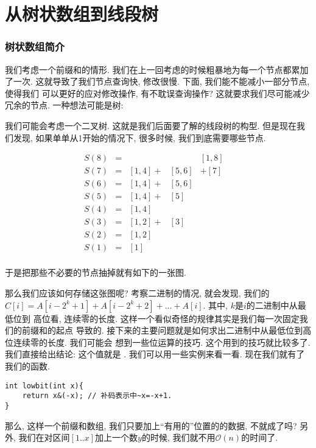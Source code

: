 \part{从树状数组到线段树}

\section{树状数组简介}

我们考虑一个前缀和的情形. 我们在上一回考虑的时候粗暴地为每一个节点都累加了一次. 
这就导致了我们节点查询快, 修改很慢. 下面, 我们能不能减小一部分节点, 使得我们
可以更好的应对修改操作, 有不耽误查询操作? 这就要求我们尽可能减少冗余的节点. 
一种想法可能是树: 


我们可能会考虑一个二叉树. 这就是我们后面要了解的线段树的构型. 但是现在我们发现, 
如果单单从1开始的情况下, 很多时候, 我们到底需要哪些节点. 

\begin{align*}
    S(8) &= &&&[1,8] &~\\
    S(7) &= &[1,4] + &[5,6] &+ [7] &~\\
    S(6) &= &[1,4] + &[5,6]&&~ \\
    S(5) &= &[1,4] + &[5]&&~ \\
    S(4) &= &[1,4]&&&~ \\
    S(3) &= &[1,2] + &[3]&&~ \\
    S(2) &= &[1,2]&&&~ \\
    S(1) &= &[1]&&&~ \\
\end{align*}

于是把那些不必要的节点抽掉就有如下的一张图. 


那么我们应该如何存储这张图呢? 考察二进制的情况, 就会发现, 我们的
$C[i]=A[i-2^k+1]+A[i-2^k+2]+...+A[i]$. 其中, $k$是$i$的二进制中从最低位到
高位看, 连续零的长度. 这样一个看似奇怪的规律其实是我们每一次固定我们的前缀和的起点
导致的. 接下来的主要问题就是如何求出二进制中从最低位到高位连续零的长度. 我们可能会 
想到一些位运算的技巧. 这个用到的技巧就比较多了. 我们直接给出结论: 这个值就是
. 我们可以用一些实例来看一看. 
现在我们就有了我们的函数. 
\begin{lstlisting}
int lowbit(int x){
    return x&(-x); // 补码表示中~x=-x+1. 
}
\end{lstlisting}

那么, 这样一个前缀和数组, 我们只要加上``有用的''位置的的数据, 不就成了吗? 另外, 
我们在对区间$[1..x]$加上一个数$y$的时候, 我们就不用$\mathcal O(n)$的时间了. 

